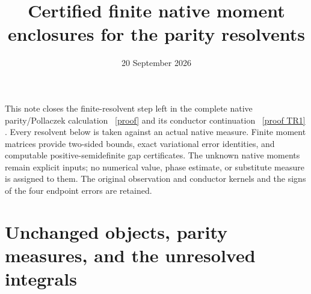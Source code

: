 \documentclass[11pt]{article}
\title{Certified finite native moment enclosures for the parity resolvents}
\author{}
\date{20 September 2026}
\begin{document}
\maketitle

This note closes the finite-resolvent step left in the complete native
parity/Pollaczek calculation \cite{PP}%
~\href{https://github.com/KokunoYumeto/zeta-function-research-reader/blob/5992ad50c0f2a06921f1fcaded7b4e38097c0739/workbenches/splitzero-tandem/continuations/20260920-original-kernel-mixed-determinants/providers/PARITY_POLLACZEK_NATIVE_RECEIVER.tex\#L1}{[proof]}%
{} and its conductor continuation
\cite{TR}%
~\href{https://github.com/KokunoYumeto/zeta-function-research-reader/blob/5992ad50c0f2a06921f1fcaded7b4e38097c0739/workbenches/splitzero-tandem/continuations/20260920-original-kernel-mixed-determinants/providers/NATIVE_TRUNCATION_CONDUCTOR_RETURN.tex\#L54}{[proof TR1]}%
{}.  Every resolvent below is taken against an actual native
measure.  Finite moment matrices provide two-sided bounds, exact
variational error identities, and computable positive-semidefinite gap
certificates.  The unknown native moments remain explicit inputs; no
numerical value, phase estimate, or substitute measure is assigned to
them.  The original observation and conductor kernels and the signs of
the four endpoint errors are retained.

\section{Unchanged objects, parity measures, and the unresolved integrals}
\end{document}
